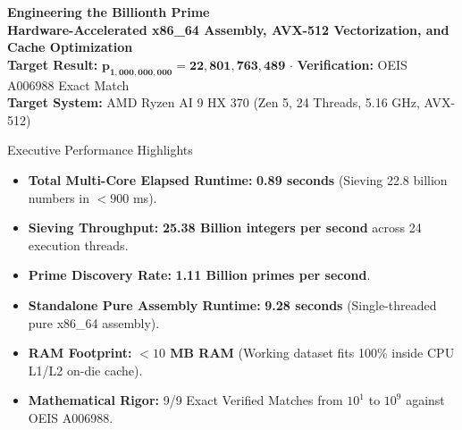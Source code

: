 \documentclass[11pt,a4paper]{article}
\begin{document}
\begin{center}
    {\LARGE \textbf{\color{navyblue}Engineering the Billionth Prime}}\\[0.18cm]
    {\large \textbf{\color{tealaccent}Hardware-Accelerated x86\_64 Assembly, AVX-512 Vectorization, and Cache Optimization}}\\[0.25cm]

    \textbf{Target Result:} $\mathbf{p_{1,000,000,000} = 22,801,763,489}$ \quad $\cdot$ \quad
    \textbf{Verification:} OEIS A006988 Exact Match \\[0.1cm]
    \textbf{Target System:} AMD Ryzen AI 9 HX 370 (Zen 5, 24 Threads, 5.16 GHz, AVX-512)
\end{center}

\vspace{-0.2cm}
\begin{infobox}{Executive Performance Highlights}
\begin{itemize}\setlength{\itemsep}{0pt}\setlength{\parskip}{0pt}
    \item \textbf{Total Multi-Core Elapsed Runtime:} \textbf{0.89 seconds} (Sieving 22.8 billion numbers in $< 900$ ms).
    \item \textbf{Sieving Throughput:} \textbf{25.38 Billion integers per second} across 24 execution threads.
    \item \textbf{Prime Discovery Rate:} \textbf{1.11 Billion primes per second}.
    \item \textbf{Standalone Pure Assembly Runtime:} \textbf{9.28 seconds} (Single-threaded pure x86\_64 assembly).
    \item \textbf{RAM Footprint:} \textbf{$< 10$ MB RAM} (Working dataset fits 100\% inside CPU L1/L2 on-die cache).
    \item \textbf{Mathematical Rigor:} 9/9 Exact Verified Matches from $10^1$ to $10^9$ against OEIS A006988.
\end{itemize}
\end{infobox}

\begin{abstract}
Finding the one-billionth prime number ($22,801,763,489$) represents a monumental computational milestone that immediately breaks conventional algorithmic implementations. Sifting through nearly 23 billion integers exceeds standard memory capacities if implemented as a monolithic array, while simple trial division would consume centuries of CPU execution time.

This guide provides a comprehensive, beginner-friendly, and mathematically rigorous journey explaining how we achieved this computation in under \textbf{one second}. By synthesizing the Segmented Sieve of Eratosthenes, Wheel-2 factorization, strict L1/L2 cache residency tuning (64 KiB segments), hand-crafted x86\_64 assembly with prime-classified loop unrolling, native 512-bit AVX-512 zero-byte counting, BMI1 bit-level prime pinpointing, and lock-free dynamic work-stealing, we unlock the full computational potential of modern processor silicon.
\end{abstract}
\end{document}
